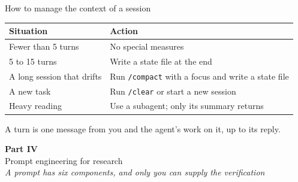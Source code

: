 \documentclass[aspectratio=169,10pt]{beamer}
\newcommand{\emphc}[1]{\textcolor{harvardcrimson}{#1}}
\newcommand{\partcard}[3]{%
  \begin{frame}{}\vfill\begin{center}
  {\Huge \textcolor{uzhblue}{\textbf{Part #1}}}\\[12pt]{\LARGE #2}\\[14pt]{\large\textcolor{uzhgreydark}{\itshape #3}}
  \end{center}\vfill\end{frame}}
\begin{document}
\begin{frame}{How to manage the context of a session}
\begin{center}
\renewcommand{\arraystretch}{1.6}
\begin{tabular}{@{}ll@{}}
\toprule
\textbf{Situation} & \textbf{Action} \\
\midrule
Fewer than 5 turns & No special measures \\
5 to 15 turns & Write a state file at the end \\
A long session that drifts & Run \texttt{/compact} with a focus and write a state file \\
A new task & Run \texttt{/clear} or start a new session \\
Heavy reading & Use a \emphc{subagent}; only its summary returns \\
\bottomrule
\end{tabular}
\end{center}
\vspace{0.6em}
{\scriptsize\textcolor{uzhgreydark}{A turn is one message from you and the agent's work on it, up to its reply.}}
\end{frame}

\partcard{IV}{Prompt engineering for research}{A prompt has six components, and only you can supply the verification}
\end{document}
